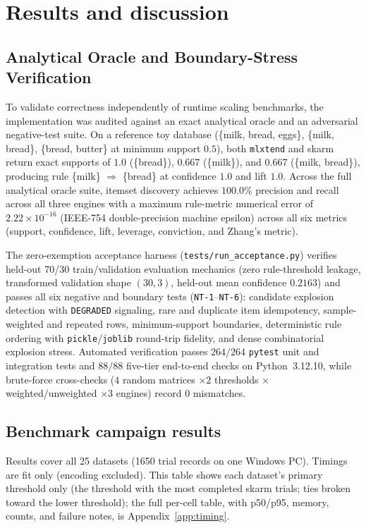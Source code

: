 \documentclass[journal,a4paper]{IEEEtran}
\newcommand{\skarm}{skarm\xspace}
\begin{document}
\section{Results and discussion}

\subsection{Analytical Oracle and Boundary-Stress Verification}
\label{sec:oracle}
To validate correctness independently of runtime scaling benchmarks, the
implementation was audited against an exact analytical oracle and an
adversarial negative-test suite. On a reference toy database (\{milk, bread,
eggs\}, \{milk, bread\}, \{bread, butter\} at minimum support $0.5$), both
\texttt{mlxtend} and \skarm return exact supports of $1.0$ (\{bread\}),
$0.667$ (\{milk\}), and $0.667$ (\{milk, bread\}), producing rule
\{milk\} $\Rightarrow$ \{bread\} at confidence $1.0$ and lift $1.0$.
Across the full analytical oracle suite, itemset discovery achieves $100.0\%$
precision and recall across all three engines with a maximum rule-metric
numerical error of $2.22 \times 10^{-16}$ (IEEE-754 double-precision machine
epsilon) across all six metrics (support, confidence, lift, leverage,
conviction, and Zhang's metric).

The zero-exemption acceptance harness (\texttt{tests/run\_acceptance.py})
verifies held-out 70/30 train/validation evaluation mechanics (zero rule-threshold
leakage, transformed validation shape $(30, 3)$, held-out mean confidence
$0.2163$) and passes all six negative and boundary tests (\texttt{NT-1}--\texttt{NT-6}):
candidate explosion detection with \texttt{DEGRADED} signaling, rare and
duplicate item idempotency, sample-weighted and repeated rows, minimum-support
boundaries, deterministic rule ordering with \texttt{pickle}/\texttt{joblib}
round-trip fidelity, and dense combinatorial explosion stress. Automated
verification passes $264/264$ \texttt{pytest} unit and integration tests and
$88/88$ five-tier end-to-end checks on Python~3.12.10, while brute-force
cross-checks ($4$ random matrices $\times 2$ thresholds $\times$ weighted/unweighted
$\times 3$ engines) record $0$ mismatches.

\subsection{Benchmark campaign results}
Results cover all 25 datasets (1650 trial records on one Windows PC). Timings are fit only (encoding excluded). This table shows each dataset's primary threshold only (the threshold with the most completed skarm trials; ties broken toward the lower threshold); the full per-cell table, with p50/p95, memory, counts, and failure notes, is Appendix~\ref{app:timing}.
\end{document}
